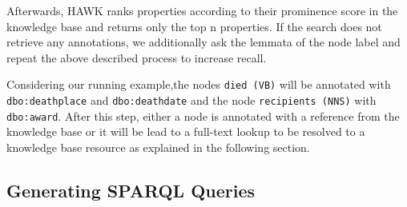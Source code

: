Afterwards, HAWK ranks properties according to their prominence score in the knowledge base and returns only the top n properties.
If the search does not retrieve any annotations, we additionally ask the lemmata of the node label and repeat the above described process to increase recall.

Considering our running example,the nodes \texttt{died (VB)} will be annotated with \texttt{dbo:deathplace} and \texttt{dbo:deathdate} and the node \texttt{recipients (NNS)} with \texttt{dbo:award}.
After this step, either a node is annotated with a reference from the knowledge base %
or it will be lead to a full-text lookup to be resolved to a knowledge base resource as explained in the following section.


\subsection{Generating SPARQL Queries}
\label{sec:full-text}

